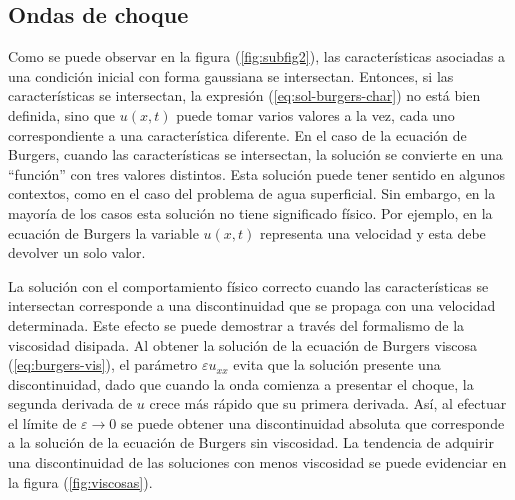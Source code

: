\subsection{Ondas de choque}
Como se puede observar en la figura (\ref{fig:subfig2}), las características asociadas a una condición inicial con forma gaussiana se intersectan. Entonces, si las características se intersectan, la expresión (\ref{eq:sol-burgers-char}) no está bien definida, sino que $u(x,t)$ puede tomar varios valores a la vez, cada uno correspondiente a una característica diferente. En el caso de la ecuación de Burgers, cuando las características se intersectan, la solución se convierte en una ``función'' con tres valores distintos. Esta solución puede tener sentido en algunos contextos, como en el caso del problema de agua superficial. Sin embargo, en la mayoría de los casos esta solución no tiene significado físico. Por ejemplo, en la ecuación de Burgers la variable $u(x,t)$ representa una velocidad y esta debe devolver un solo valor.

La solución con el comportamiento físico correcto cuando las características se intersectan corresponde a una discontinuidad que se propaga con una velocidad determinada. Este efecto se puede demostrar a través del formalismo de la viscosidad disipada. Al obtener la solución de la ecuación de Burgers viscosa (\ref{eq:burgers-vis}), el parámetro $\varepsilon u_{xx}$ evita que la solución presente una discontinuidad, dado que cuando la onda comienza a presentar el choque, la segunda derivada de $u$ crece más rápido que su primera derivada. Así, al efectuar el límite de $\varepsilon \rightarrow 0$ se puede obtener una discontinuidad absoluta que corresponde a la solución de la ecuación de Burgers sin viscosidad. La tendencia de adquirir una discontinuidad  de las soluciones con menos viscosidad se puede evidenciar en la figura (\ref{fig:viscosas}).

